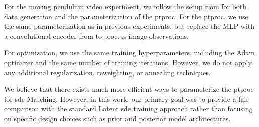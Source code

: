 \documentclass{article}
\theoremstyle{plain}
\theoremstyle{definition}
\theoremstyle{remark}
\begin{document}
For the moving pendulum video experiment, we follow the setup from \citet{course2024amortized} for both data generation and the parameterization of the \gls{prproc}. For the \gls{ptproc}, we use the same parameterization as in previous experiments, but replace the MLP with a convolutional encoder from \citet{course2024amortized} to process image observations.


For optimization, we use the same training hyperparameters, including the Adam optimizer \cite{kingma2014adam} and the same number of training iterations. However, we do not apply any additional regularization, reweighting, or annealing techniques.


We believe that there exists much more efficient ways to parameterize the \gls{ptproc} for \gls{sde} Matching. However, in this work, our primary goal was to provide a fair comparison with the standard Latent \gls{sde} training approach rather than focusing on specific design choices such as prior and posterior model architectures.
\end{document}
